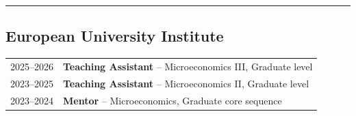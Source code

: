 \hrule %
\vspace{2mm}

\subsection*{European University Institute}

\begin{longtable}[l]{@{}p{} p{}}

    2025--2026 & \textbf{Teaching Assistant} – Microeconomics III, Graduate level \\[5pt]
    2023--2025 & \textbf{Teaching Assistant} – Microeconomics II, Graduate level \\[5pt]
    2023--2024 & \textbf{Mentor} – Microeconomics, Graduate core sequence 

\end{longtable}
